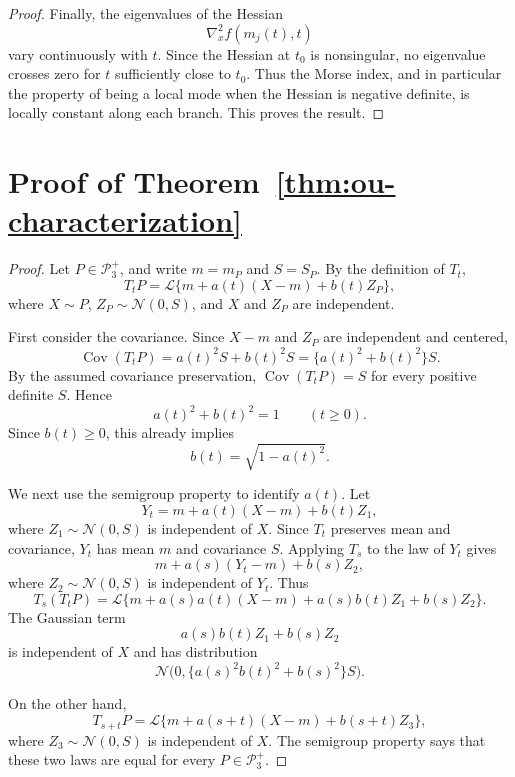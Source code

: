 \documentclass[preprint]{imsart}
\theoremstyle{plain}
\theoremstyle{definition}
\newcommand{\Cov}{\operatorname{Cov}}
\newcommand{\Normal}{\mathcal{N}}
\begin{document}
\begin{appendix}
\begin{proof}
Finally, the eigenvalues of the Hessian
\[
  \nabla_x^2 f(m_j(t),t)
\]
vary continuously with \(t\). Since the Hessian at \(t_0\) is nonsingular,
no eigenvalue crosses zero for \(t\) sufficiently close to \(t_0\). Thus
the Morse index, and in particular the property of being a local mode
when the Hessian is negative definite, is locally constant along each
branch. This proves the result.
\end{proof}


\section{Proof of Theorem~\ref{thm:ou-characterization}}\label{app:proof2}
\begin{proof}
Let \(P\in\mathcal P_3^+\), and write \(m=m_P\) and \(S=S_P\). By the
definition of \(T_t\),
\[
  T_tP
  =
  \mathcal L\{m+a(t)(X-m)+b(t)Z_P\},
\]
where \(X\sim P\), \(Z_P\sim \Normal(0,S)\), and \(X\) and \(Z_P\) are
independent.

First consider the covariance. Since \(X-m\) and \(Z_P\) are independent
and centered,
\[
  \Cov(T_tP)
  =
  a(t)^2 S+b(t)^2S
  =
  \{a(t)^2+b(t)^2\}S.
\]
By the assumed covariance preservation, \(\Cov(T_tP)=S\) for every
positive definite \(S\). Hence
\[
  a(t)^2+b(t)^2=1
  \qquad (t\ge0).
\]
Since \(b(t)\ge0\), this already implies
\[
  b(t)=\sqrt{1-a(t)^2}.
\]

We next use the semigroup property to identify \(a(t)\). Let
\[
  Y_t=m+a(t)(X-m)+b(t)Z_1,
\]
where \(Z_1\sim\Normal(0,S)\) is independent of \(X\). Since \(T_t\)
preserves mean and covariance, \(Y_t\) has mean \(m\) and covariance \(S\).
Applying \(T_s\) to the law of \(Y_t\) gives
\[
  m+a(s)(Y_t-m)+b(s)Z_2,
\]
where \(Z_2\sim\Normal(0,S)\) is independent of \(Y_t\). Thus
\[
  T_s(T_tP)
  =
  \mathcal L\{m+a(s)a(t)(X-m)+a(s)b(t)Z_1+b(s)Z_2\}.
\]
The Gaussian term
\[
  a(s)b(t)Z_1+b(s)Z_2
\]
is independent of \(X\) and has distribution
\[
  \Normal\bigl(0,\{a(s)^2b(t)^2+b(s)^2\}S\bigr).
\]

On the other hand,
\[
  T_{s+t}P
  =
  \mathcal L\{m+a(s+t)(X-m)+b(s+t)Z_3\},
\]
where \(Z_3\sim\Normal(0,S)\) is independent of \(X\). The semigroup
property says that these two laws are equal for every \(P\in\mathcal P_3^+\).


\end{proof}
\end{appendix}
\end{document}
